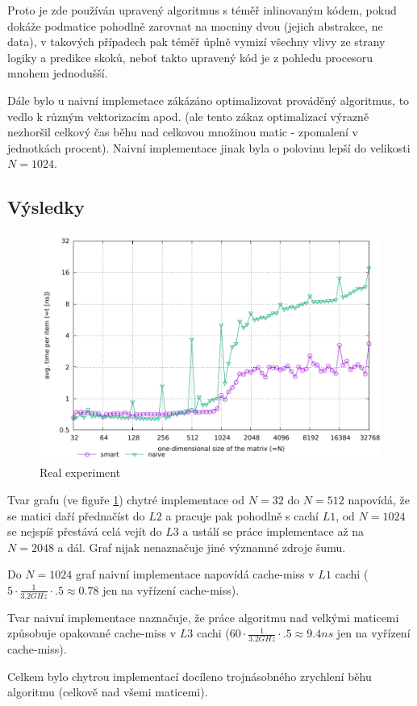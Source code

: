 \documentclass[a4paper,12pt]{article} %
\begin{document}
Proto je zde používán upravený algoritmus s téměř inlinovaným kódem, pokud dokáže podmatice pohodlně zarovnat na mocniny dvou (jejich abstrakce, ne data), v takových případech pak téměř úplně vymizí všechny vlivy ze strany logiky a predikce skoků, neboť takto upravený kód je z pohledu procesoru mnohem jednodušší.

Dále bylo u naivní implemetace zákázáno optimalizovat prováděný algoritmus, to vedlo k různým vektorizacím apod. (ale tento zákaz optimalizací výrazně nezhoršil celkový čas běhu nad celkovou množinou matic - zpomalení v jednotkách procent). Naivní implementace jinak byla o polovinu lepší do velikosti $N = 1024$.

\subsection{Výsledky}

\begin{figure}[!hbt]
	\caption{Real experiment}
	\label{realgraph}
	\includegraphics{real.pdf}
\end{figure}

Tvar grafu (ve figuře \ref{realgraph}) chytré implementace od $N = 32$ do $N=512$ napovídá, že se matici daří přednačíst do $L2$ a pracuje pak pohodlně s cachí $L1$, od $N=1024$ se nejspíš přestává celá vejít do $L3$ a ustálí se práce implementace až na $N=2048$ a dál. Graf nijak nenaznačuje jiné významné zdroje šumu.

Do $N=1024$ graf naivní implementace napovídá cache-miss v $L1$ cachi ($5 \cdot \frac{1}{3.2 GHz} \cdot .5 \approx 0.78$ jen na vyřízení cache-miss).

Tvar naivní implementace naznačuje, že práce algoritmu nad velkými maticemi způsobuje opakované cache-miss v $L3$ cachi ($60 \cdot \frac{1}{3.2 GHz} \cdot {.5} \approx 9.4 ns$ jen na vyřízení cache-miss).

Celkem bylo chytrou implementací docíleno trojnásobného zrychlení běhu algoritmu (celkově nad všemi maticemi).
\end{document}
